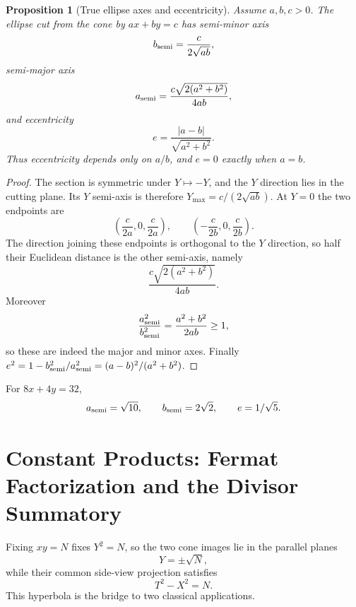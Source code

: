 \documentclass[11pt]{amsart}
\newtheorem{proposition}[theorem]{Proposition}
\theoremstyle{remark}
\numberwithin{equation}{section}
\begin{document}
\begin{proposition}[True ellipse axes and eccentricity]\label{prop:trueaxes}
Assume $a,b,c>0$. The ellipse cut from the cone by $ax+by=c$ has semi-minor axis
\begin{equation}
b_{\rm semi}=\frac{c}{2\sqrt{ab}},
\end{equation}
semi-major axis
\begin{equation}
a_{\rm semi}=\frac{c\sqrt{2(a^2+b^2)}}{4ab},
\end{equation}
and eccentricity
\begin{equation}
e=\frac{|a-b|}{\sqrt{a^2+b^2}}.
\end{equation}
Thus eccentricity depends only on $a/b$, and $e=0$ exactly when $a=b$.
\end{proposition}
\begin{proof}
The section is symmetric under $Y\mapsto-Y$, and the $Y$ direction lies in the cutting plane. Its $Y$ semi-axis is therefore $Y_{\max}=c/(2\sqrt{ab})$. At $Y=0$ the two endpoints are
\begin{equation}
\left(\frac{c}{2a},0,\frac{c}{2a}\right),\qquad
\left(-\frac{c}{2b},0,\frac{c}{2b}\right).
\end{equation}
The direction joining these endpoints is orthogonal to the $Y$ direction, so half their Euclidean distance is the other semi-axis, namely
\begin{equation}
\frac{c\sqrt{2(a^2+b^2)}}{4ab}.
\end{equation}
Moreover
\begin{equation}
\frac{a_{\rm semi}^2}{b_{\rm semi}^2}=\frac{a^2+b^2}{2ab}\ge1,
\end{equation}
so these are indeed the major and minor axes. Finally $e^2=1-b_{\rm semi}^2/a_{\rm semi}^2=(a-b)^2/(a^2+b^2)$.
\end{proof}

For $8x+4y=32$,
\begin{equation}
a_{\rm semi}=\sqrt{10},\qquad b_{\rm semi}=2\sqrt2,\qquad e=1/\sqrt5.
\end{equation}

\section{Constant Products: Fermat Factorization and the Divisor Summatory}
Fixing $xy=N$ fixes $Y^2=N$, so the two cone images lie in the parallel planes
\begin{equation}
Y=\pm\sqrt N,
\end{equation}
while their common side-view projection satisfies
\begin{equation}
T^2-X^2=N.
\end{equation}
This hyperbola is the bridge to two classical applications.
\end{document}
